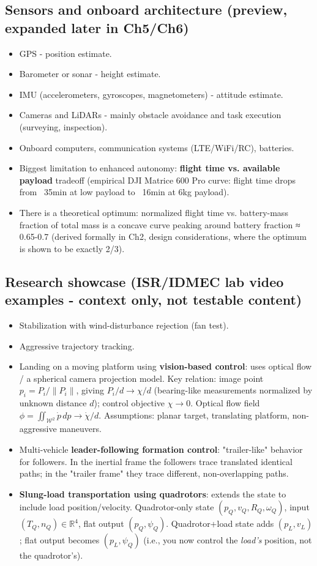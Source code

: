 \documentclass[11pt]{article}
\begin{document}
\subsection{Sensors and onboard architecture (preview, expanded later in Ch5/Ch6)}
\begin{itemize}
\item GPS - position estimate.
\item Barometer or sonar - height estimate.
\item IMU (accelerometers, gyroscopes, magnetometers) - attitude estimate.
\item Cameras and LiDARs - mainly obstacle avoidance and task execution (surveying, inspection).
\item Onboard computers, communication systems (LTE/WiFi/RC), batteries.
\item Biggest limitation to enhanced autonomy: \textbf{flight time vs. available payload} tradeoff (empirical DJI Matrice 600 Pro curve: flight time drops from ~35min at low payload to ~16min at 6kg payload).
\item There is a theoretical optimum: normalized flight time vs. battery-mass fraction of total mass is a concave curve peaking around battery fraction ≈ 0.65-0.7 (derived formally in Ch2, design considerations, where the optimum is shown to be exactly 2/3).
\end{itemize}

\subsection{Research showcase (ISR/IDMEC lab video examples - context only, not testable content)}
\begin{itemize}
\item Stabilization with wind-disturbance rejection (fan test).
\item Aggressive trajectory tracking.
\item Landing on a moving platform using \textbf{vision-based control}: uses optical flow / a spherical camera projection model. Key relation: image point $p_i = P_i / \|P_i\|$, giving $P_i/d \to \chi/d$ (bearing-like measurements normalized by unknown distance $d$); control objective $\chi \to 0$. Optical flow field $\phi = \iint_{\mathcal{W}^2} \dot p \, dp \to \dot\chi/d$. Assumptions: planar target, translating platform, non-aggressive maneuvers.
\item Multi-vehicle \textbf{leader-following formation control}: "trailer-like" behavior for followers. In the inertial frame the followers trace translated identical paths; in the "trailer frame" they trace different, non-overlapping paths.
\item \textbf{Slung-load transportation using quadrotors}: extends the state to include load position/velocity. Quadrotor-only state $(p_Q,v_Q,R_Q,\omega_Q)$, input $(T_Q,n_Q)\in\mathbb{R}^4$, flat output $(p_Q,\psi_Q)$. Quadrotor+load state adds $(p_L,v_L)$; flat output becomes $(p_L,\psi_Q)$ (i.e., you now control the \textit{load's} position, not the quadrotor's).
\end{itemize}
\end{document}
